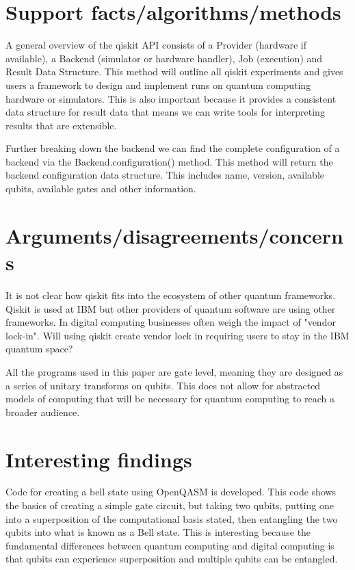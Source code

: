 \documentclass{article}
\begin{document}
\section{Support facts/algorithms/methods}

A general overview of the qiskit API consists of a Provider (hardware if available), a Backend (simulator or hardware handler), Job (execution) and Result Data Structure. This method will outline all qiskit experiments and gives users a framework to design and implement runs on quantum computing hardware or simulators. This is also important because it provides a consistent data structure for result data that means we can write tools for interpreting results that are extensible.

Further breaking down the backend we can find the complete configuration of a backend via the Backend.configuration() method. This method will return the backend configuration data structure. This includes name, version, available qubits, available gates and other information.

\section{Arguments/disagreements/concerns}

It is not clear how qiskit fits into the ecosystem of other quantum frameworks. Qiskit is used at IBM but other providers of quantum software are using other frameworks. In digital computing businesses often weigh the impact of "vendor lock-in". Will using qiskit create vendor lock in requiring users to stay in the IBM quantum space? 

All the programs used in this paper are gate level, meaning they are designed as a series of unitary transforms on qubits. This does not allow for abstracted models of computing that will be necessary for quantum computing to reach a broader audience.

\section{Interesting findings}
Code for creating a bell state using OpenQASM is developed. This code shows the basics of creating a simple gate circuit, but taking two qubits, putting one into a superposition of the computational basis stated, then entangling the two qubits into what is known as a Bell state. This is interesting because the fundamental differences between quantum computing and digital computing is that qubits can experience superposition and multiple qubits can be entangled.
\end{document}
